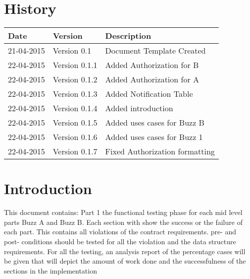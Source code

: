 \documentclass[12pt]{article}
\begin{document}


\section{History}
\begin{tabular}{|p{3cm}|p{5cm}|p{6cm}|}

\hline
Date & Version & Description\\ %
\hline
21-04-2015 & Version 0.1 & Document Template Created\\ %
\hline
22-04-2015 & Version 0.1.1 & Added Authorization for B\\ %
\hline
22-04-2015 & Version 0.1.2 & Added Authorization for A\\ %
\hline
22-04-2015 & Version 0.1.3 & Added Notification Table\\ %
\hline
22-04-2015 & Version 0.1.4 & Added introduction\\ %
\hline
22-04-2015 & Version 0.1.5 & Added uses cases for Buzz B\\ %
\hline
22-04-2015 & Version 0.1.6 & Added uses cases for Buzz 1\\ %
\hline
22-04-2015 & Version 0.1.7 & Fixed Authorization formatting\\ %
\hline

\end{tabular}

\newpage
\tableofcontents
\newpage

\section{Introduction} %
This document contains:
Part 1 the functional testing phase for each mid level parts Buzz A and Buzz B.
Each section with show the success or the failure of each part. This contains all violations of the contract requirements.
pre- and post- conditions should be tested for all the violation and the data structure requirements.
For all the testing, an analysis report of the percentage cases will be given that will depict the amount of work done and the successfulness of the sections in the implementation
\end{document}
